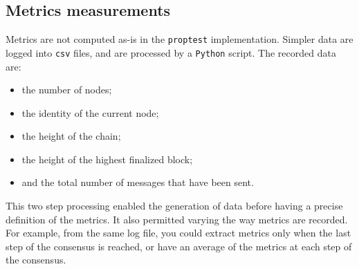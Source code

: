 \subsection{Metrics measurements}
\label{ssec:metricsMeasurements}
Metrics are not computed as-is in the \texttt{proptest} implementation. Simpler
data are logged into \texttt{csv} files, and are processed by a \texttt{Python}
script. The recorded data are:
\begin{itemize}
    \item the number of nodes;
    \item the identity of the current node;
    \item the height of the chain;
    \item the height of the highest finalized block;
    \item and the total number of messages that have been sent.
\end{itemize}
This two step processing enabled the generation of
data before having a precise definition of the metrics. It also permitted varying
the way metrics are recorded. For example, from the same log file, you could
extract metrics only when the last step of the consensus is reached, or have an
average of the metrics at each step of the consensus.
